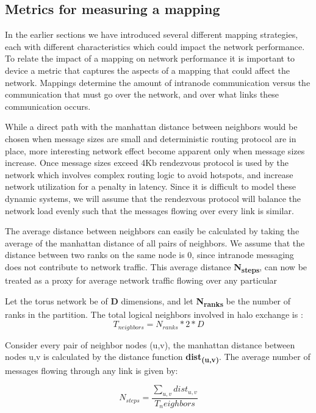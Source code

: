 \documentclass{acm_proc_article-sp}
\begin{document}
\subsection{Metrics for measuring a mapping}

In the earlier sections we have introduced several different mapping strategies, each with different characteristics which could
impact the network performance. To relate the impact of a mapping on network performance it is important to device a metric that
captures the aspects of a mapping that could affect the network. Mappings determine the amount of intranode communication versus
the communication that must go over the network, and over what links these communication occurs.

While a direct path with the manhattan distance between neighbors would be chosen when message sizes are small and deterministic routing
protocol are in place, more interesting network effect become apparent only when message sizes increase. Once message sizes exceed 4Kb
rendezvous protocol is used by the network which involves complex routing logic to avoid hotspots, and increase network utilization for
a penalty in latency. Since it is difficult to model these dynamic systems, we will assume that the rendezvous protocol will balance
the network load evenly such that the messages flowing over every link is similar.


The average distance between neighbors can easily be calculated by taking the average of the manhattan distance of all pairs of neighbors.
We assume that the distance between two ranks on the same node is 0, since intranode messaging does not contribute to network traffic.
This average distance \textbf{N\textsubscript{steps}}, can now be treated as a proxy for average network traffic flowing over any particular 



Let the torus network be of \textbf{D} dimensions, and let \textbf{N\textsubscript{ranks}} be the number of ranks in the partition.
The total logical neighbors involved in halo exchange is :
\begin{equation}
  T_{neighbors} = N_{ranks} * 2 * D
\end{equation}

Consider every pair of neighbor nodes (u,v), the manhattan distance between nodes u,v is calculated by the distance function \textbf{dist\textsubscript{(u,v)}}.
The average number of messages flowing through any link is given by:

\begin{equation}
  N_{steps} = \frac{ \sum\limits_{u,v} dist_{u,v} } {T_neighbors}
\end{equation}
\end{document}
